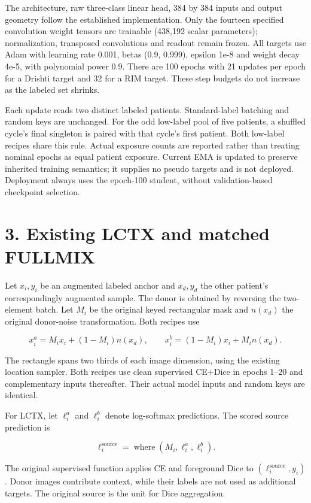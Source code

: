 \documentclass[
]{article}
\begin{document}
The architecture, raw three-class linear head, 384 by 384 inputs and
output geometry follow the established implementation. Only the fourteen
specified convolution weight tensors are trainable (438,192 scalar
parameters); normalization, transposed convolutions and readout remain
frozen. All targets use Adam with learning rate 0.001, betas (0.9,
0.999), epsilon 1e-8 and weight decay 4e-5, with polynomial power 0.9.
There are 100 epochs with 21 updates per epoch for a Drishti target and
32 for a RIM target. These step budgets do not increase as the labeled
set shrinks.

Each update reads two distinct labeled patients. Standard-label batching
and random keys are unchanged. For the odd low-label pool of five
patients, a shuffled cycle's final singleton is paired with that cycle's
first patient. Both low-label recipes share this rule. Actual exposure
counts are reported rather than treating nominal epochs as equal patient
exposure. Current EMA is updated to preserve inherited training
semantics; it supplies no pseudo targets and is not deployed. Deployment
always uses the epoch-100 student, without validation-based checkpoint
selection.

\section{3. Existing LCTX and matched
FULLMIX}\label{existing-lctx-and-matched-fullmix}

Let \(x_i,y_i\) be an augmented labeled anchor and \(x_d,y_d\) the other
patient's correspondingly augmented sample. The donor is obtained by
reversing the two-element batch. Let \(M_i\) be the original keyed
rectangular mask and \(n(x_d)\) the original donor-noise transformation.
Both recipes use

\[x_i^a=M_i x_i+(1-M_i)n(x_d),\qquad x_i^b=(1-M_i)x_i+M_i n(x_d).\]

The rectangle spans two thirds of each image dimension, using the
existing location sampler. Both recipes use clean supervised CE+Dice in
epochs 1--20 and complementary inputs thereafter. Their actual model
inputs and random keys are identical.

For LCTX, let \(\ell_i^a\) and \(\ell_i^b\) denote log-softmax
predictions. The scored source prediction is

\[\ell_i^{\mathrm{source}}=\operatorname{where}(M_i,\ell_i^a,\ell_i^b).\]

The original supervised function applies CE and foreground Dice to
\((\ell_i^{\mathrm{source}},y_i)\). Donor images contribute context,
while their labels are not used as additional targets. The original
source is the unit for Dice aggregation.
\end{document}
